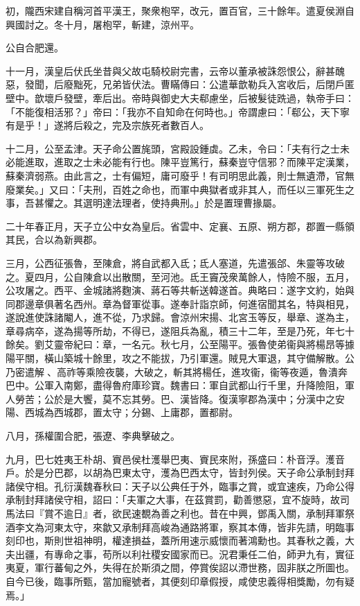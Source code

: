 \begin{pinyinscope}
初，隴西宋建自稱河首平漢王，聚衆枹罕，改元，置百官，三十餘年。遣夏侯淵自興國討之。冬十月，屠枹罕，斬建，涼州平。

公自合肥還。

十一月，漢皇后伏氏坐昔與父故屯騎校尉完書，云帝以董承被誅怨恨公，辭甚醜惡，發聞，后廢黜死，兄弟皆伏法。曹瞞傳曰：公遣華歆勒兵入宮收后，后閉戶匿壁中。歆壞戶發壁，牽后出。帝時與御史大夫郗慮坐，后被髮徒跣過，執帝手曰：「不能復相活邪？」帝曰：「我亦不自知命在何時也。」帝謂慮曰：「郗公，天下寧有是乎！」遂將后殺之，完及宗族死者數百人。

十二月，公至孟津。天子命公置旄頭，宮殿設鍾虡。乙未，令曰：「夫有行之士未必能進取，進取之士未必能有行也。陳平豈篤行，蘇秦豈守信邪？而陳平定漢業，蘇秦濟弱燕。由此言之，士有偏短，庸可廢乎！有司明思此義，則士無遺滯，官無廢業矣。」又曰：「夫刑，百姓之命也，而軍中典獄者或非其人，而任以三軍死生之事，吾甚懼之。其選明達法理者，使持典刑。」於是置理曹掾屬。

二十年春正月，天子立公中女為皇后。省雲中、定襄、五原、朔方郡，郡置一縣領其民，合以為新興郡。

三月，公西征張魯，至陳倉，將自武都入氐；氐人塞道，先遣張郃、朱靈等攻破之。夏四月，公自陳倉以出散關，至河池。氐王竇茂衆萬餘人，恃險不服，五月，公攻屠之。西平、金城諸將麴演、蔣石等共斬送韓遂首。典略曰：遂字文約，始與同郡邊章俱著名西州。章為督軍從事。遂奉計詣京師，何進宿聞其名，特與相見，遂說進使誅諸閹人，進不從，乃求歸。會涼州宋揚、北宮玉等反，舉章、遂為主，章尋病卒，遂為揚等所劫，不得已，遂阻兵為亂，積三十二年，至是乃死，年七十餘矣。劉艾靈帝紀曰：章，一名元。秋七月，公至陽平。張魯使弟衞與將楊昂等據陽平關，橫山築城十餘里，攻之不能拔，乃引軍還。賊見大軍退，其守備解散。公乃密遣解𢢼、高祚等乘險夜襲，大破之，斬其將楊任，進攻衞，衞等夜遁，魯潰奔巴中。公軍入南鄭，盡得魯府庫珍寶。魏書曰：軍自武都山行千里，升降險阻，軍人勞苦；公於是大饗，莫不忘其勞。巴、漢皆降。復漢寧郡為漢中；分漢中之安陽、西城為西城郡，置太守；分錫、上庸郡，置都尉。

八月，孫權圍合肥，張遼、李典擊破之。

九月，巴七姓夷王朴胡、賨邑侯杜濩舉巴夷、賨民來附，孫盛曰：朴音浮。濩音戶。於是分巴郡，以胡為巴東太守，濩為巴西太守，皆封列侯。天子命公承制封拜諸侯守相。孔衍漢魏春秋曰：天子以公典任于外，臨事之賞，或宜速疾，乃命公得承制封拜諸侯守相，詔曰：「夫軍之大事，在茲賞罰，勸善懲惡，宜不旋時，故司馬法曰『賞不逾日』者，欲民速覩為善之利也。昔在中興，鄧禹入關，承制拜軍祭酒李文為河東太守，來歙又承制拜高峻為通路將軍，察其本傳，皆非先請，明臨事刻印也，斯則世祖神明，權達損益，蓋所用速示威懷而著鴻勳也。其春秋之義，大夫出疆，有專命之事，苟所以利社稷安國家而已。況君秉任二伯，師尹九有，實征夷夏，軍行蕃甸之外，失得在於斯須之間，停賞俟詔以滯世務，固非朕之所圖也。自今已後，臨事所甄，當加寵號者，其便刻印章假授，咸使忠義得相獎勵，勿有疑焉。」


\end{pinyinscope}
